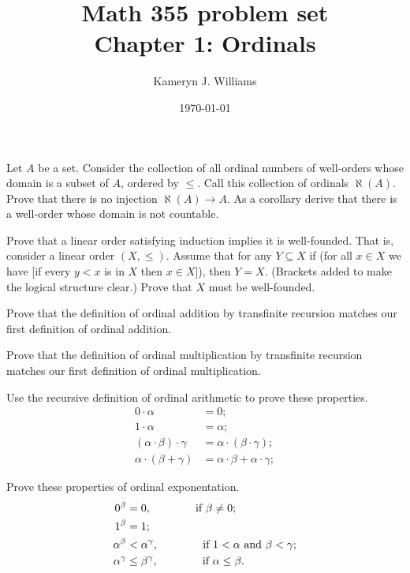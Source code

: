 \documentclass[10pt]{amsart}
\title{Math 355 problem set \\ Chapter 1: Ordinals}
\author{Kameryn J. Williams}
\date{\today}
\begin{document}
\maketitle


\begin{problem}
Let $A$ be a set. Consider the collection of all ordinal numbers of well-orders whose domain is a subset of $A$, ordered by $\le$. Call this collection of ordinals $\aleph(A)$. Prove that there is no injection $\aleph(A) \to A$. As a corollary derive that there is a well-order whose domain is not countable.
\end{problem}

\begin{problem}
Prove that a linear order satisfying induction implies it is well-founded. That is, consider a linear order $(X,\le)$. Assume that for any $Y \subseteq X$ if (for all  $x \in X$ we have [if every $y < x$ is in $X$ then $x \in X$]), then $Y = X$. (Brackets added to make the logical structure clear.) Prove that $X$ must be well-founded.
\end{problem}

\begin{problem}
Prove that the definition of ordinal addition by transfinite recursion matches our first definition of ordinal addition.
\end{problem}

\begin{problem}
Prove that the definition of ordinal multiplication by transfinite recursion matches our first definition of ordinal multiplication.
\end{problem}


\begin{problem}
Use the recursive definition of ordinal arithmetic to prove these properties.
\begin{align*}
0 \cdot \alpha &= 0; \\
1 \cdot \alpha &= \alpha; \\
(\alpha \cdot \beta) \cdot \gamma &= \alpha \cdot (\beta \cdot \gamma); \\
\alpha \cdot (\beta + \gamma) &= \alpha \cdot \beta + \alpha \cdot \gamma;
\end{align*}
\end{problem}

\begin{problem}
Prove these properties of ordinal exponentation.
\begin{align*}
0^\beta &= 0, \qquad\qquad\text{if } \beta \ne 0; \\
1^\beta &= 1; \\
\alpha^\beta &< \alpha^\gamma, \qquad\qquad\text{if } 1 < \alpha \textrm{ and } \beta < \gamma; \\
\alpha^\gamma &\le \beta^\gamma, \qquad\qquad\text{if } \alpha \le \beta.
\end{align*}
\end{problem}
\end{document}
